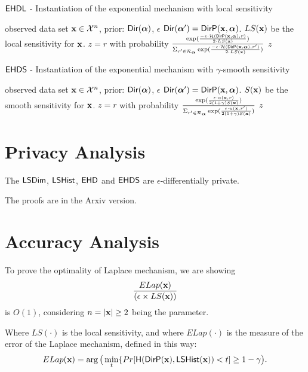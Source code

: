 \documentclass{article}
\begin{document}
%
%
%
%
%
  \begin{algorithm}
  \caption{$\mathsf{EHDL}$ - Instantiation
	of the exponential mechanism with local sensitivity}
  \label{mech:lexpmech}
  \begin{algorithmic}
   observed data set $\textbf{x} \in \mathcal{X}^n$, prior: $\mathsf{Dir}(\boldsymbol{\alpha})$, $\epsilon$
  \STATE {} $\mathsf{Dir}(\boldsymbol{\alpha}')= \mathsf{DirP}(\textbf{x},\boldsymbol{\alpha})$.
  \STATE {} $LS(\textbf{x})$ be the local sensitivity for $\textbf{x}$.
  \STATE {} $z=r$ with probability $\frac
  {\exp(\frac{-\epsilon\cdot \mathcal{H}(\mathsf{DirP}(\textbf{x},\boldsymbol{\alpha}), r)}{2\cdot LS(\textbf{x})})}
{\Sigma_{r' \in \mathcal{R}_{\boldsymbol{\alpha}}}\exp(\frac{-\epsilon\cdot \mathcal{H}(\mathsf{DirP}(\textbf{x},\boldsymbol{\alpha}), r')}{2\cdot LS(\textbf{x})})}$
 $z$
  \end{algorithmic}
  \end{algorithm}
%
%
  \begin{algorithm}
  \caption{$\mathsf{EHDS}$ - Instantiation
	of the exponential mechanism with $\gamma$-smooth sensitivity}
  \label{mech:sexpmech}
  \begin{algorithmic}
  \STATE observed data set $\textbf{x} \in \mathcal{X}^n$, prior: $\mathsf{Dir}(\boldsymbol{\alpha})$, $\epsilon$
  \STATE {} $\mathsf{Dir}(\boldsymbol{\alpha}')= \mathsf{DirP}(\textbf{x},\boldsymbol{\alpha})$.   
  \STATE {} $S(\textbf{x})$ be the smooth sensitivity for $\textbf{x}$.
  \STATE {} $z=r$ with probability $\frac{\exp(\frac{\epsilon\cdot u(\textbf{x}, {r})}{2 (1 + \gamma) S(\textbf{x})})}{\Sigma_{r' \in \mathcal{R}_{\boldsymbol{\alpha}}}\exp(\frac{\epsilon\cdot u(\textbf{x}, r')}{2 (1 + \gamma) S(\textbf{x})})}$
 $z$
  \end{algorithmic}
\end{algorithm}


\clearpage
\section{Privacy Analysis}
\begin{thm}
The $\mathsf{LSDim}$, $\mathsf{LSHist}$, $\mathsf{EHD}$ and $\mathsf{EHDS}$ are $\epsilon$-differentially private.
\end{thm}
The proofs are in the Arxiv version.

\clearpage
\section{Accuracy Analysis}
{\color{red}
\begin{thm}
To prove the optimality of Laplace mechanism, we are showing 
\[
\frac{ELap(\textbf{x})}{(\epsilon \times LS(\textbf{x}))}
\]
is {\color{red}$O(1)$}, considering $n=|\textbf{x}| \geq 2$ being the parameter.

Where $LS(\cdot)$ is the local sensitivity, and where $ELap(\cdot)$ is the measure of the error of the Laplace mechanism, defined in this way:
 \[
ELap(\textbf{x}) = \arg\big( \min\limits_{t}\{Pr[\mathsf{H}(\mathsf{DirP}(\textbf{x}), \mathsf{LSHist}(\textbf{x}))< t] \geq 1 - \gamma \big).
\]
\end{thm}
}
\end{document}
